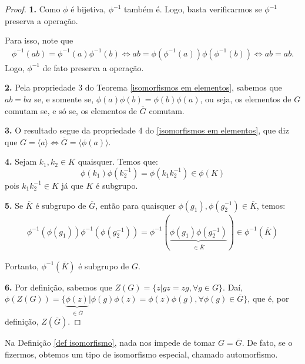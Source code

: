 \documentclass[a4paper,portuguese,11pt,twoside, leqno]{book}
\theoremstyle{definition}
\begin{document}
	\begin{proof}
		\textbf{1.} Como $\phi$ é bijetiva, $\phi^{-1}$ também é. Logo, basta verificarmos se $\phi^{-1}$ preserva a operação. 
		\par\vspace{0.3cm} Para isso, note que 
		\begin{align*}
		\phi^{-1}(ab) = \phi^{-1}(a)\phi^{-1}(b) \Leftrightarrow ab = \phi(\phi^{-1}(a))\phi(\phi^{-1}(b)) \Leftrightarrow ab = ab.
		\end{align*} 
		Logo, $\phi^{-1}$ de fato preserva a operação.
		\par\vspace{0.4cm}
		\textbf{2.} Pela propriedade 3 do Teorema \eqref{isomorfismos em elementos}, sabemos que $ab = ba$ se, e somente se, $\phi(a)\phi(b) = \phi(b)\phi(a)$, ou seja, os elementos de $G$ comutam se, e só se, os elementos de $\overline{G}$ comutam.
		\par\vspace{0.4cm}
		\textbf{3.} O resultado segue da propriedade 4 do \eqref{isomorfismos em elementos}, que diz que $G = \langle a\rangle \Leftrightarrow \overline{G} = \langle \phi(a)\rangle$.
		\par\vspace{0.4cm}
		\textbf{4.} Sejam $k_1, k_2 \in K$ quaisquer. Temos que:
		\begin{equation*}
		\phi(k_1)\phi(k_2^{-1}) = \phi(k_1k_2^{-1}) \in\phi(K)
		\end{equation*}
		pois $k_1k_2^{-1} \in K$ já que $K$ é subgrupo. 
		\par\vspace{0.4cm}
		\textbf{5.} Se $\overline{K}$ é subgrupo de $\overline{G}$, então para quaisquer $\phi(g_1), \phi(g_2^{-1})\in \overline{K}$, temos:
		\begin{align*}
		\phi^{-1}(\phi(g_1))\phi^{-1}(\phi(g_2^{-1})) = \phi^{-1}(\underbrace{\phi(g_1)\phi(g_2^{-1})}_{\in\overline{K}}) \in \phi^{-1}(\overline{K})
		\end{align*}
		\par\vspace{0.3cm} Portanto, $\phi^{-1}(\overline{K})$ é subgrupo de $G$.
		\par\vspace{0.4cm}
		\textbf{6.} Por definição, sabemos que $Z(G) = \{ z|gz = zg, \forall g\in G \}$. Daí, $\phi(Z(G)) = \{ \underbrace{\phi(z)}_{\in \overline{G}} | \phi(g)\phi(z) = \phi(z)\phi(g), \forall \phi(g)\in\overline{G}\}$, que é, por definição, $Z(\overline{G})$.
		
	\end{proof}
	\par\vspace{0.3cm} Na Definição \eqref{def isomorfismo}, nada nos impede de tomar $G = \overline{G}$. De fato, se o fizermos, obtemos um tipo de isomorfismo especial, chamado automorfismo.
	
\end{document}
